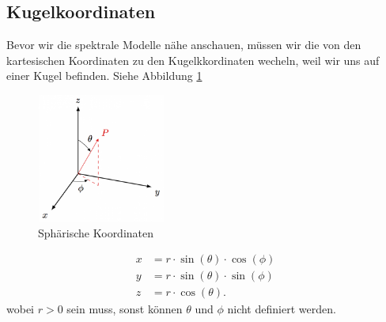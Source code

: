 \subsection{Kugelkoordinaten
\label{spektral:subsection:kugelkoordinaten}}

Bevor wir die spektrale Modelle nähe anschauen, müssen wir die von den kartesischen Koordinaten zu den Kugelkkordinaten wecheln, weil wir uns auf einer Kugel befinden. Siehe Abbildung \ref{spektral:fig:sphericalcoords}

\begin{figure}[h]
	\centering
	\includegraphics[height=120pt,width=120pt]{papers/spektral/images/spherical_coordinates.png}
	\caption{Sphärische Koordinaten}
    \label{spektral:fig:sphericalcoords}
\end{figure}
\pagebreak

\begin{align}
x &= r\cdot\sin(\theta)\cdot\cos(\phi)
\label{spektral:equation4}
\\
 y &= r\cdot\sin(\theta)\cdot\sin(\phi)
\label{spektral:equation5}
\\
 z &= r\cdot\cos(\theta).
\label{spektral:equation6}
\end{align}
wobei $r > 0$ sein muss, sonst können $\theta$ und $\phi$ nicht definiert werden.



